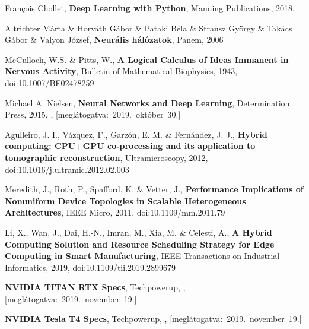 \begin{thebibliography}{9}
	François Chollet,
	\textbf{Deep Learning with Python},
	Manning Publications,
	2018.

	Altrichter Márta \& Horváth Gábor \& Pataki Béla \& Strausz György \& Takács Gábor \& Valyon József,
	\textbf{Neurális hálózatok},
	Panem,
	2006

	McCulloch, W.S. \& Pitts, W.,
	\textbf{A Logical Calculus of Ideas Immanent in Nervous Activity},
	Bulletin of Mathematical Biophysics,
	1943,
	doi:10.1007/BF02478259

	Michael A. Nielsen,
	\textbf{Neural Networks and Deep Learning},
	Determination Press,
	2015,
	,
	\mbox{[meglátogatva:~2019.~október~30.]}

	Agulleiro, J. I., Vázquez, F., Garzón, E. M. \& Fernández, J. J., \textbf{Hybrid computing: CPU+GPU co-processing and its application to tomographic reconstruction},
	Ultramicroscopy,
	2012,
	doi:10.1016/j.ultramic.2012.02.003 

	Meredith, J., Roth, P., Spafford, K. \& Vetter, J.,
	\textbf{Performance Implications of Nonuniform Device Topologies in Scalable Heterogeneous Architectures},
	IEEE Micro,
	2011,
	doi:10.1109/mm.2011.79 

	Li, X., Wan, J., Dai, H.-N., Imran, M., Xia, M. \& Celesti, A.,
	\textbf{A Hybrid Computing Solution and Resource Scheduling Strategy for Edge Computing in Smart Manufacturing},
	IEEE Transactions on Industrial Informatics,
	2019,
	doi:10.1109/tii.2019.2899679

	\textbf{NVIDIA TITAN RTX Specs},
	Techpowerup,
	,
	\mbox{[meglátogatva:~2019.~november~19.]}

	\textbf{NVIDIA Tesla T4 Specs},
	Techpowerup,
	,
	\mbox{[meglátogatva:~2019.~november~19.]}


\end{thebibliography}
